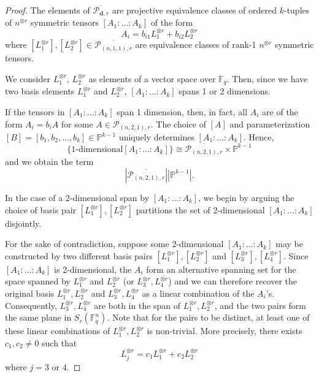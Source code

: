\documentclass[10pt,a4paper]{amsart}
\newcommand{\F}{\mathbb{F}}
\newcommand{\dd}{\mathbf{d}}    %
\begin{document}
    \begin{proof}
        The elements of $\overline{\mathcal{P}_{\dd, r}}$ are projective equivalence classes of ordered $k$-tuples of $n^{\otimes r}$ symmetric tensors $\left[A_1:...:A_k\right]$ of the form 
        $$A_i = b_{i1} L_1^{\otimes r} + b_{i2} L_2^{\otimes r}$$
        where $\left[L_1^{\otimes r}\right], \left[L_2^{\otimes r}\right] \in \overline{\mathcal{P}_{(n,1,1),r}}$ are equivalence classes of rank-1 $n^{\otimes r}$ symmetric tensors. 
    
        We consider $L_1^{\otimes r}$, $L_2^{\otimes r}$ as elements of a vector space over $\mathbb{F}_q$. Then, since we have two basis elements $L_1^{\otimes r}$ and $L_2^{\otimes r}$, $\left[A_1:...:A_k\right]$ spans 1 or 2 dimensions. 
    
        If the tensors in $\left[A_1:...:A_k\right]$ span 1 dimension, then, in fact, all $A_i$ are of the form
        $A_i = b_iA$
        for some $A \in \mathcal{P}_{(n,2,1),r}$. The choice of $\left[A\right]$ and parameterization $\left[B\right] = \left[b_1, b_2, ..., b_k\right] \in \mathbb{P}^{k-1}$ uniquely determines $\left[A_1:...:A_k\right]$. Hence, 
        $$\{\text{1-dimensional} \left[A_1:...:A_k\right]\} \cong \overline{\mathcal{P}_{(n,2,1), r}} \times \mathbb{P}^{k-1}$$ 
        and we obtain the term
        $$\left|\overline{\mathcal{P}_{(n,2,1), r}}\right| \left|\mathbb{P}^{k-1}\right|.$$
    
        In the case of a 2-dimensional span by $\left[A_1:...:A_k\right]$, we begin by arguing the choice of basis pair $\left[L_1^{\otimes r}\right],\left[L_2^{\otimes r}\right]$ partitions the set of 2-dimensional $\left[A_1:...:A_k\right]$ disjointly.
        
        For the sake of contradiction, suppose some 2-dimensional $\left[A_1:...:A_k\right]$ may be constructed by two different basis pairs $\left[L_1^{\otimes r}\right],\left[L_2^{\otimes r}\right]$ and $\left[L_3^{\otimes r}\right],\left[L_4^{\otimes r}\right]$. Since $\left[A_1:...:A_k\right]$ is 2-dimensional, the $A_i$ form an alternative spanning set for the space spanned by $L_1^{\otimes r}$ and $L_2^{\otimes r}$ (or $ L_3^{\otimes r}, L_4^{\otimes r}$) and we can therefore recover the original basis $L_1^{\otimes r},L_2^{\otimes r}$ and $ L_3^{\otimes r}, L_4^{\otimes r}$ as a linear combination of the $A_i$'s. Consequently, $L_3^{\otimes r}, L_4^{\otimes r}$ are both in the span of $L_1^{\otimes r},L_2^{\otimes r}$, and the two pairs form the same plane in $S_r(\F_q^n)$. Note that for the pairs to be distinct, at least one of these linear combinations of $L_1^{\otimes r},L_2^{\otimes r}$ is non-trivial. More precisely, there exists $c_1,c_2 \neq 0$ such that
        $$L_j^{\otimes r} = c_1L_1^{\otimes r} + c_2L_2^{\otimes r}$$
        where $j = 3$ or $4$.


\end{proof}
\end{document}
